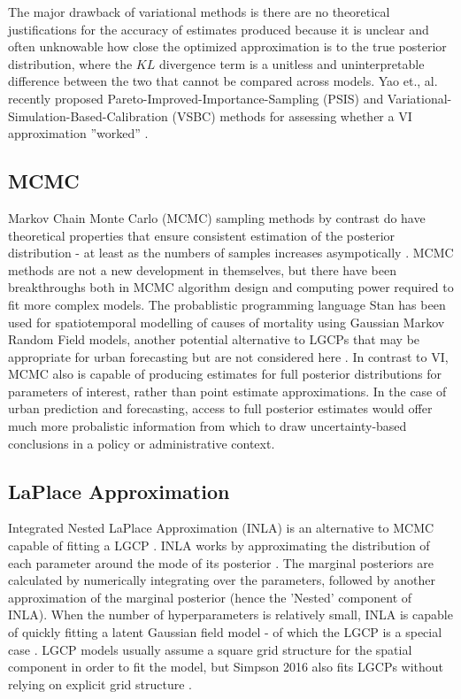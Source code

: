 The major drawback of variational methods is there are no theoretical justifications for the accuracy of estimates produced because it is unclear and often unknowable how close the optimized approximation is to the true posterior distribution, where the $KL$ divergence term is a unitless and uninterpretable difference between the two that cannot be compared across models. Yao et., al. recently proposed Pareto-Improved-Importance-Sampling (PSIS) and Variational-Simulation-Based-Calibration (VSBC) methods for assessing whether a VI approximation ''worked'' \cite{yao_2018}.

\subsection{MCMC}

Markov Chain Monte Carlo (MCMC) sampling methods by contrast do have theoretical properties that ensure consistent estimation of the posterior distribution - at least  as the numbers of samples increases asympotically \cite{teng_2017}. MCMC methods are not a new development in themselves, but there have been breakthroughs both in MCMC algorithm design and computing power required to fit more complex models. The probablistic programming language Stan has been used for spatiotemporal modelling of causes of mortality using Gaussian Markov Random Field models, another potential alternative to LGCPs that may be appropriate for urban forecasting but are not considered here \cite{stan} \cite{foreman_2017}. In contrast to VI, MCMC also is capable of producing estimates for full posterior distributions for parameters of interest, rather than point estimate approximations. In the case of urban prediction and forecasting, access to full posterior estimates would offer much more probalistic information from which to draw uncertainty-based conclusions in a policy or administrative context.

\subsection{LaPlace Approximation}

Integrated Nested LaPlace Approximation (INLA) is an alternative to MCMC capable of fitting a LGCP \cite{illian_toolbox}. INLA works by approximating the distribution of each parameter around the mode of its posterior \cite{lindgren2015bayesian}. The marginal posteriors are calculated by numerically integrating over the parameters, followed by another approximation of the marginal posterior (hence the 'Nested' component of INLA). When the number of hyperparameters is relatively small, INLA is capable of quickly fitting a latent Gaussian field model - of which the LGCP is a special case \cite{rue2009approximate}. LGCP models usually assume a square grid structure for the spatial component in order to fit the model, but Simpson 2016 also fits LGCPs without relying on explicit grid structure \cite{simpson2016going}.


